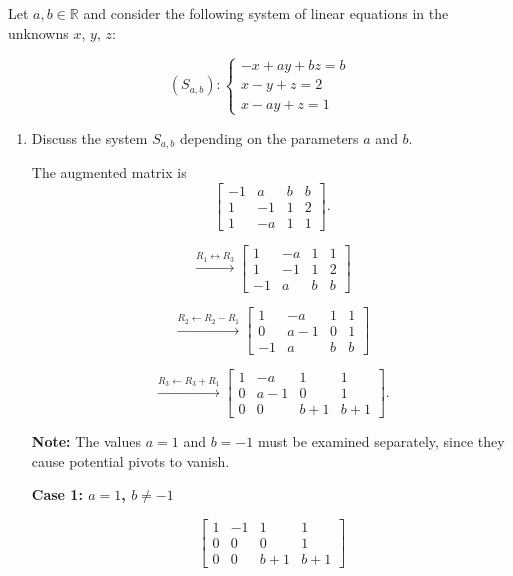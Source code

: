 \item Let $a,b\in\mathbb R$ and consider
the following system of linear equations
in the unknowns $x$, $y$, $z$:

$$
(S_{a,b}):
\begin{cases}
-x+ay+bz=b\\
x-y+z=2\\
x-ay+z=1
\end{cases}
$$

\begin{enumerate}[label=\alph*)]

\item Discuss the system $S_{a,b}$
depending on the parameters $a$ and $b$.

\begin{answer}
    The augmented matrix is
    $$
    \left[
    \begin{array}{ccc|c}
    -1&a&b&b\\
    1&-1&1&2\\
    1&-a&1&1
    \end{array}
    \right].
    $$

    $$
    \xrightarrow{R_1\leftrightarrow R_3}
    \left[
    \begin{array}{ccc|c}
    1&-a&1&1\\
    1&-1&1&2\\
    -1&a&b&b
    \end{array}
    \right]
    $$

    $$
    \xrightarrow{R_2\leftarrow R_2-R_1}
    \left[
    \begin{array}{ccc|c}
    1&-a&1&1\\
    0&a-1&0&1\\
    -1&a&b&b
    \end{array}
    \right]
    $$

    $$
    \xrightarrow{R_3\leftarrow R_3+R_1}
    \left[
    \begin{array}{ccc|c}
    1&-a&1&1\\
    0&a-1&0&1\\
    0&0&b+1&b+1
    \end{array}
    \right].
    $$

    {\color{red}
    \textbf{Note:} The values $a=1$
    and $b=-1$ must be examined
    separately, since they cause
    potential pivots to vanish.
    }

    \textbf{Case 1: $a=1$, $b\neq-1$}

    $$
    \left[
    \begin{array}{ccc|c}
    1&-1&1&1\\
    0&0&0&1\\
    0&0&b+1&b+1
    \end{array}
    \right]
    $$


\end{answer}
\end{enumerate}

